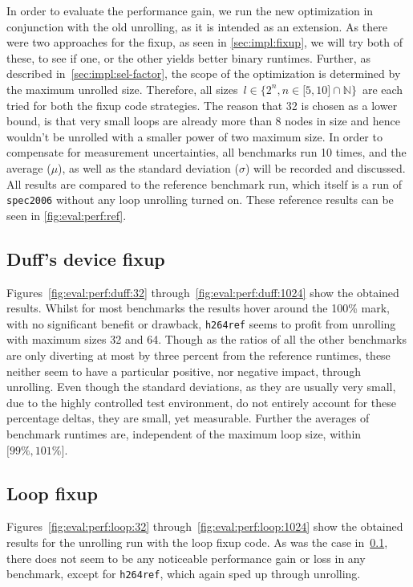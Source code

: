 In order to evaluate the performance gain, we run the new optimization in conjunction with the old unrolling, as it is intended as an extension.
As there were two approaches for the fixup, as seen in \cref{sec:impl:fixup}, we will try both of these, to see if one, or the other yields better binary runtimes.
Further, as described in~\cref{sec:impl:sel-factor}, the scope of the optimization is determined by the maximum unrolled size.
Therefore, all sizes~$l \in \{2^n, n \in \lbrack 5, 10 \rbrack \cap \mathbb{N}\}$~are each tried for both the fixup code strategies.
The reason that 32 is chosen as a lower bound, is that very small loops are already more than 8 nodes in size and hence wouldn't be unrolled with a smaller power of two maximum size.
In order to compensate for measurement uncertainties, all benchmarks run 10 times, and the average ($\mu$), as well as the standard deviation ($\sigma$) will be recorded and discussed.
All results are compared to the reference benchmark run, which itself is a run of \texttt{spec2006} without any loop unrolling turned on.
These reference results can be seen in \cref{fig:eval:perf:ref}.



\subsection{Duff's device fixup}\label{sec:eval:perf:duff}



Figures~\ref{fig:eval:perf:duff:32} through~\ref{fig:eval:perf:duff:1024} show the obtained results.
Whilst for most benchmarks the results hover around the 100\% mark, with no significant benefit or drawback, \texttt{h264ref} seems to profit from unrolling with maximum sizes 32 and 64.
Though as the ratios of all the other benchmarks are only diverting at most by three percent from the reference runtimes, these neither seem to have a particular positive, nor negative impact, through unrolling.
Even though the standard deviations, as they are usually very small, due to the highly controlled test environment, do not entirely account for these percentage deltas, they are small, yet measurable.
Further the averages of benchmark runtimes are, independent of the maximum loop size, within $\lbrack 99\%, 101\% \rbrack$.

\subsection{Loop fixup}\label{sec:eval:perf:loop}



Figures~\ref{fig:eval:perf:loop:32} through~\ref{fig:eval:perf:loop:1024} show the obtained results for the unrolling run with the loop fixup code.
As was the case in~\cref{sec:eval:perf:duff}, there does not seem to be any noticeable performance gain or loss in any benchmark, except for \texttt{h264ref}, which again sped up through unrolling.

